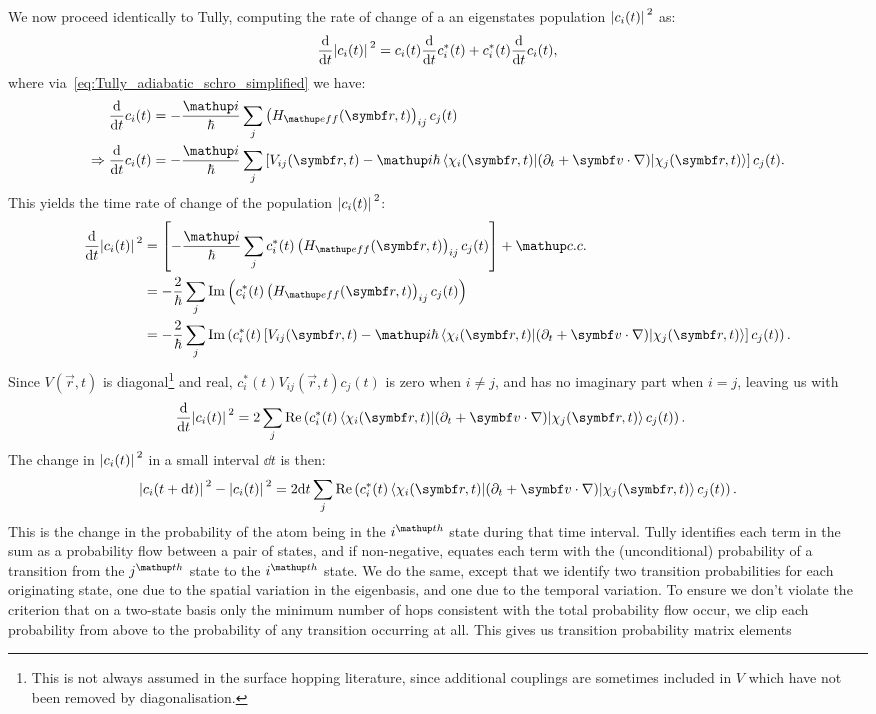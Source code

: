 We now proceed identically to Tully, computing the rate of change of a an eigenstates population $\abs{c_i(t)}^2$ as:
\begin{align}
\dv{t}\abs{c_i(t)}^2 = c_i(t) \dv{t}c_i^*(t) + c_i^*(t) \dv{t}c_i(t),
\end{align}
where via~\eqref{eq:Tully_adiabatic_schro_simplified} we have:
\begin{align}
\dv{t}c_i(t) &= -\frac\ii\hbar\sum_j \left(H_\up{eff}(\vec r, t)\right)_{ij} c_j(t)\\
\Rightarrow \dv{t}c_i(t) &= -\frac\ii\hbar \sum_j\left[V_{ij}(\vec r, t)
  - \ii\hbar\matrixel{\chi_i(\vec r, t)}{(\partial_t + \vec v\cdot\nabla)}{\chi_j(\vec r, t)}
 \right] c_j(t).
\end{align}
This yields the time rate of change of the population $\abs{c_i(t)}^2$:
\begin{align}
\dv{t}\abs{c_i(t)}^2 &= \left[-\frac\ii\hbar \sum_j c_i^*(t) \left(H_\up{eff}(\vec r, t)\right)_{ij} c_j(t)\right] + \up{c.c.}\\
&= -\frac2\hbar\sum_j\im\left(c_i^*(t) \left(H_\up{eff}(\vec r, t)\right)_{ij} c_j(t)\right)\label{eq:fewest_switches_Heff}\\
&= -\frac2\hbar\sum_j\im\left(c_i^*(t)
\left[V_{ij}(\vec r, t)
  - \ii\hbar\matrixel{\chi_i(\vec r, t)}{(\partial_t + \vec v\cdot\nabla)}{\chi_j(\vec r, t)}
 \right]
 c_j(t)\right).
\end{align}
Since $V(\vec r, t)$ is diagonal\footnote{This is not always assumed in the surface hopping literature, since additional couplings are sometimes included in $V$ which have not been removed by diagonalisation.} and real, $c_i^*(t)V_{ij}(\vec r, t)c_j(t)$ is zero when $i\neq j$, and has no imaginary part when $i=j$, leaving us with
\begin{align}
\dv{t}\abs{c_i(t)}^2 &= 2\sum_j\re\left(c_i^*(t)
  \matrixel{\chi_i(\vec r, t)}{(\partial_t + \vec v\cdot\nabla)}{\chi_j(\vec r, t)}
 c_j(t)\right).
\end{align}
The change in $\abs{c_i(t)}^2$ in a small interval $\dd t$ is then:
\begin{align}\label{eq:Tully_change_in_prob}
\abs{c_i(t + \dd t)}^2 - \abs{c_i(t)}^2 = 2\dd t
\sum_j\re\left(c_i^*(t)
  \matrixel{\chi_i(\vec r, t)}{(\partial_t + \vec v\cdot\nabla)}{\chi_j(\vec r, t)}
 c_j(t)\right).
\end{align}
This is the change in the probability of the atom being in the $i^\up{th}$ state during that time interval. Tully identifies each term in the sum as a probability flow between a pair of states, and if non-negative, equates each term with the (unconditional) probability of a transition from the $j^\up{th}$ state to the $i^\up{th}$ state. We do the same, except that we identify two transition probabilities for each originating state, one due to the spatial variation in the eigenbasis, and one due to the temporal variation. To ensure we don't violate the criterion that on a two-state basis only the minimum number of hops consistent with the total probability flow occur, we clip each probability from above to the probability of any transition occurring at all. This gives us transition probability matrix elements
